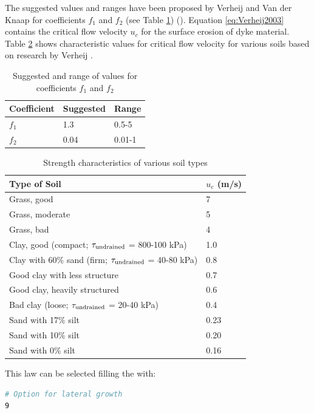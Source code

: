 \begin{itemize}
The suggested values and ranges have been proposed by Verheij and Van der Knaap
\cite{Verheij2003} for coefficients $f_1$ and $f_2$ (see Table
\ref{tab:coef:verheij2003})
(\cite{Curran2018,VanDamme2020}).
Equation \eqref{eq:Verheij2003} contains the critical flow velocity $u_c$ for
the surface erosion of dyke material.
Table \ref{tab:uc} shows characteristic values for critical flow velocity for
various soils based on research by Verheij \cite{Verheij2002}.
\begin{table}
\centering
\caption{Suggested and range of values for coefficients $f_1$ and $f_2$}
\begin{tabular}{lll}
\hline
Coefficient & Suggested & Range \\
\hline
$f_1$ & 1.3 & 0.5-5 \\
$f_2$ & 0.04 & 0.01-1 \\
\hline
\end{tabular}
\label{tab:coef:verheij2003}
\end{table}
\begin{table}
\centering
\caption{Strength characteristics of various soil types
 \cite{Verheij2003}\cite{Verheij2009}}
\begin{tabular}{ll}
\hline
Type of Soil & $u_c$ (m/s) \\
\hline
Grass, good & 7 \\
Grass, moderate & 5 \\
Grass, bad & 4 \\
Clay, good (compact; $\tau_{\rm{undrained}}$ = 800-100 kPa) & 1.0 \\
Clay with 60\% sand (firm; $\tau_{\rm{undrained}}$ = 40-80 kPa) & 0.8 \\
Good clay with less structure & 0.7 \\
Good clay, heavily structured & 0.6 \\
Bad clay (loose; $\tau_{\rm{undrained}}$ = 20-40 kPa) & 0.4 \\
Sand with 17\% silt & 0.23 \\
Sand with 10\% silt & 0.20 \\
Sand with 0\% silt & 0.16 \\
\hline
\end{tabular}
\label{tab:uc}
\end{table}

This law can be selected filling the  with:
\begin{lstlisting}[language=bash]
# Option for lateral growth
9
\end{lstlisting}
\end{itemize}
